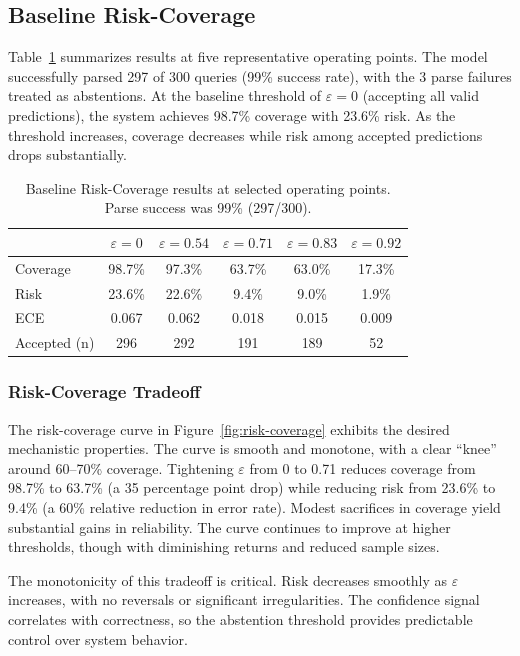 \documentclass{article}
\begin{document}
\subsection{Baseline Risk-Coverage}

Table~\ref{tab:baseline-results} summarizes results at five representative operating points. The model successfully parsed 297 of 300 queries (99\% success rate), with the 3 parse failures treated as abstentions. At the baseline threshold of $\varepsilon=0$ (accepting all valid predictions), the system achieves 98.7\% coverage with 23.6\% risk. As the threshold increases, coverage decreases while risk among accepted predictions drops substantially.

\begin{table}[h]
\centering
\begin{tabular}{lccccc}
\toprule
 & \textbf{$\varepsilon=0$} & \textbf{$\varepsilon=0.54$} & \textbf{$\varepsilon=0.71$} & \textbf{$\varepsilon=0.83$} & \textbf{$\varepsilon=0.92$} \\
\midrule
Coverage & 98.7\% & 97.3\% & 63.7\% & 63.0\% & 17.3\% \\
Risk & 23.6\% & 22.6\% & 9.4\% & 9.0\% & 1.9\% \\
ECE & 0.067 & 0.062 & 0.018 & 0.015 & 0.009 \\
Accepted (n) & 296 & 292 & 191 & 189 & 52 \\
\bottomrule
\end{tabular}
\caption{Baseline Risk-Coverage results at selected operating points. Parse success was 99\% (297/300).}
\label{tab:baseline-results}
\end{table}

\subsubsection{Risk-Coverage Tradeoff}

The risk-coverage curve in Figure~\ref{fig:risk-coverage} exhibits the desired mechanistic properties. The curve is smooth and monotone, with a clear ``knee'' around 60--70\% coverage. Tightening $\varepsilon$ from 0 to 0.71 reduces coverage from 98.7\% to 63.7\% (a 35 percentage point drop) while reducing risk from 23.6\% to 9.4\% (a 60\% relative reduction in error rate). Modest sacrifices in coverage yield substantial gains in reliability. The curve continues to improve at higher thresholds, though with diminishing returns and reduced sample sizes.

The monotonicity of this tradeoff is critical. Risk decreases smoothly as $\varepsilon$ increases, with no reversals or significant irregularities. The confidence signal correlates with correctness, so the abstention threshold provides predictable control over system behavior.
\end{document}
